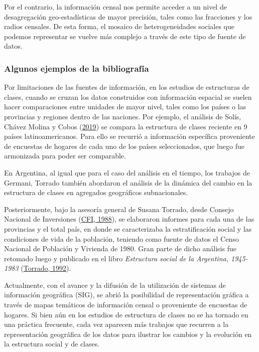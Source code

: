 \documentclass[
]{article}
\begin{document}
Por el contrario, la información censal nos permite acceder a un nivel de desagregación geo-estadísticas de mayor precisión, tales como las fracciones y los radios censales. De esta forma, el mosaico de heterogeneidades sociales que podemos representar se vuelve más complejo a través de este tipo de fuente de datos.

\hypertarget{algunos-ejemplos-de-la-bibliografuxeda-1}{%
\subsubsection{Algunos ejemplos de la bibliografía}\label{algunos-ejemplos-de-la-bibliografuxeda-1}}

Por limitaciones de las fuentes de información, en los estudios de estructuras de clases, cuando se cruzan los datos construidos con información espacial se suelen hacer comparaciones entre unidades de mayor nivel, tales como los países o las provincias y regiones dentro de las naciones. Por ejemplo, el análisis de Solís, Chávez Molina y Cobos (\protect\hyperlink{ref-Solis.etal2019}{2019}) se compara la estructura de clases reciente en 9 países latinoamericanos. Para ello se recurrió a información específica proveniente de encuestas de hogares de cada uno de los países seleccionados, que luego fue armonizada para poder ser comparable.

En Argentina, al igual que para el caso del análisis en el tiempo, los trabajos de Germani, Torrado también abordaron el análisis de la dinámica del cambio en la estructura de clases en agregados geográficos subnacionales.

Posteriormente, bajo la asesoría general de Susana Torrado, desde Consejo Nacional de Inversiones (\protect\hyperlink{ref-CFI1988}{CFI, 1988}), se elaboraron informes para cada una de las provincias y el total país, en donde se caracterizaba la estratificación social y las condiciones de vida de la población, teniendo como fuente de datos el Censo Nacional de Población y Vivienda de 1980. Gran parte de dicho análisis fue retomado luego y publicado en el libro \emph{Estructura social de la Argentina, 1945-1983} (\protect\hyperlink{ref-Torrado1992}{Torrado, 1992}).

Actualmente, con el avance y la difusión de la utilización de sistemas de información geográfica (SIG), se abrió la posibilidad de representación gráfica a través de mapas temáticos de información censal o proveniente de encuestas de hogares. Si bien aún en los estudios de estructura de clases no se ha tornado en una práctica frecuente, cada vez aparecen más trabajos que recurren a la representación geográfica de los datos para ilustrar los cambios y la evolución en la estructura social y de clases.
\end{document}
